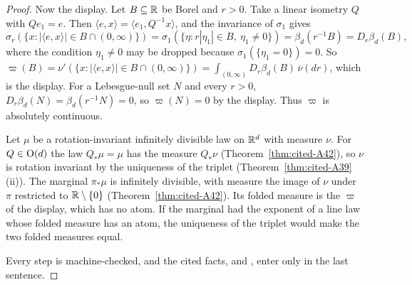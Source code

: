 \begin{proof}
Now the display. Let $B \subseteq \mathbb{R}$ be Borel and $r > 0$. Take a linear isometry $Q$ with
$Qe_1 = e$. Then $\langle e, x\rangle = \langle e_1, Q^{-1}x\rangle$, and the invariance of $\sigma_1$
gives
\[
  \sigma_r(\{x : |\langle e, x\rangle| \in B \cap (0,\infty)\})
  = \sigma_1(\{\eta : r|\eta_1| \in B,\ \eta_1 \ne 0\}) = \beta_d(r^{-1}B) = D_r\beta_d(B) ,
\]
where the condition $\eta_1 \ne 0$ may be dropped because $\sigma_1(\{\eta_1 = 0\}) = 0$. So
$\varpi(B) = \nu'(\{x : |\langle e, x\rangle| \in B \cap (0,\infty)\})
= \int_{(0,\infty)}D_r\beta_d(B)\,\overline\nu(dr)$, which is the display. For a Lebesgue-null set
$N$ and every $r > 0$, $D_r\beta_d(N) = \beta_d(r^{-1}N) = 0$, so $\varpi(N) = 0$ by the display.
Thus $\varpi$ is absolutely continuous.

Let $\mu$ be a rotation-invariant infinitely divisible law on $\mathbb{R}^d$ with \Levy{} measure $\nu$. For
$Q \in \mathrm{O}(d)$ the law $Q_*\mu = \mu$ has the \Levy{} measure $Q_*\nu$
(Theorem~\ref{thm:cited-A42}), so $\nu$ is rotation invariant by the
uniqueness of the triplet (Theorem~\ref{thm:cited-A39}(ii)). The marginal $\pi_*\mu$ is
infinitely divisible, with \Levy{} measure the image of $\nu$ under $\pi$ restricted to
$\mathbb{R} \setminus \{0\}$ (Theorem~\ref{thm:cited-A42}). Its folded \Levy{} measure is the
$\varpi$ of the display, which has no atom. If the marginal had the exponent of a line law whose folded
\Levy{} measure has an atom, the uniqueness of the triplet would make the two folded measures equal.

Every step is machine-checked, and the cited facts,  and , enter only in
the last sentence.
\end{proof}


